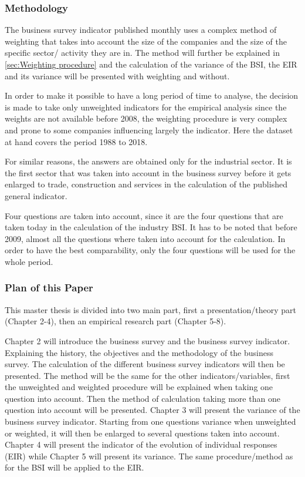 \documentclass[12pt,a4paper,oneside]{book}
\begin{document}
\subsubsection{Methodology}

The business survey indicator published monthly uses a complex method of weighting that takes into account the size of the companies and the size of the specific sector/ activity they are in. The method will further be explained in \autoref{sec:Weighting procedure} and the calculation of the variance of the BSI, the EIR and its variance will be presented with weighting and without.

In order to make it possible to have a long period of time to analyse, the decision is made to take only unweighted indicators for the empirical analysis since the weights are not available before 2008, the weighting procedure is very complex and prone to some companies influencing largely the indicator. 
Here the dataset at hand covers the period 1988 to 2018.

For similar reasons, the answers are obtained only for the industrial sector.
It is the first sector that was taken into account in the business survey before it gets enlarged to trade, construction and services in the calculation of the published general indicator.



Four questions are taken into account, since it are the four questions that are taken today in the calculation of the industry BSI. 
It has to be noted that before 2009, almost all the questions where taken into account for the calculation. In order to have the best comparability, only the four questions will be used for the whole period. 

\subsubsection{Plan of this Paper}

This master thesis is divided into two main part, first a presentation/theory part (Chapter 2-4), then an empirical research part (Chapter 5-8).

Chapter 2 will introduce the business survey and the business survey indicator. Explaining the history, the objectives and the methodology of the business survey. The calculation of the different business survey indicators will then be presented. The method will be the same for the other indicators/variables, first the unweighted and weighted procedure will be explained when taking one question into account. Then the method of calculation taking more than one question into account will be presented.
Chapter 3 will present the variance of the business survey indicator. Starting from one questions variance when unweighted or weighted, it will then be enlarged to several questions taken into account.
Chapter 4 will present the indicator of the evolution of individual responses (EIR) while Chapter 5 will present its variance. The same procedure/method as for the BSI will be applied to the EIR.
\end{document}

